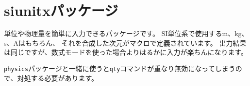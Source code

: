 \section{siunitxパッケージ}

単位や物理量を簡単に入力できるパッケージです。
SI単位系で使用する\unit{m}、\unit{kg}、\unit{s}、\unit{A}はもちろん、
それを合成した次元がマクロで定義されています。
出力結果は同じですが、数式モードを使った場合よりはるかに入力が楽ちんになります。

\texttt{physics}パッケージと一緒に使うと\texttt{qty}コマンドが重なり無効になってしまうので、対処する必要があります。
